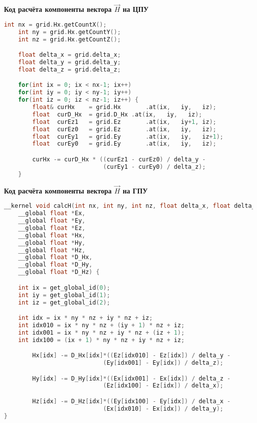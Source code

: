 
\textbf{Код расчёта компоненты вектора $ \vec{H} $ на ЦПУ}

\begin{lstlisting}[label={lst:HCPU},language=C++]
    int nx = grid.Hx.getCountX();
    int ny = grid.Hx.getCountY();
    int nz = grid.Hx.getCountZ();

    float delta_x = grid.delta_x;
    float delta_y = grid.delta_y;
    float delta_z = grid.delta_z;

    for(int ix = 0; ix < nx-1; ix++)
    for(int iy = 0; iy < ny-1; iy++)
    for(int iz = 0; iz < nz-1; iz++) {
        float& curHx	= grid.Hx		.at(ix,   iy,   iz);
        float  curD_Hx	= grid.D_Hx	.at(ix,   iy,   iz);
        float  curEz1	= grid.Ez		.at(ix,   iy+1, iz);
        float  curEz0	= grid.Ez		.at(ix,   iy,   iz);
        float  curEy1	= grid.Ey		.at(ix,   iy,   iz+1);
        float  curEy0	= grid.Ey		.at(ix,   iy,   iz);

        curHx -= curD_Hx * ((curEz1 - curEz0) / delta_y -
                            (curEy1 - curEy0) / delta_z);
    }
\end{lstlisting}

\clearpage


\textbf{Код расчёта компоненты вектора $ \vec{H} $ на ГПУ}

\begin{lstlisting}[label={lst:HGPU},language=C++]
__kernel void calcH(int nx, int ny, int nz, float delta_x, float delta_y, float delta_z,
    __global float *Ex,
    __global float *Ey,
    __global float *Ez,
    __global float *Hx,
    __global float *Hy,
    __global float *Hz,
    __global float *D_Hx,
    __global float *D_Hy,
    __global float *D_Hz) {

    int ix = get_global_id(0);
    int iy = get_global_id(1);
    int iz = get_global_id(2);

    int idx = ix * ny * nz + iy * nz + iz;
    int idx010 = ix * ny * nz + (iy + 1) * nz + iz;
    int idx001 = ix * ny * nz + iy * nz + (iz + 1);
    int idx100 = (ix + 1) * ny * nz + iy * nz + iz;

        Hx[idx] -= D_Hx[idx]*((Ez[idx010] - Ez[idx]) / delta_y -
                            (Ey[idx001] - Ey[idx]) / delta_z);

        Hy[idx] -= D_Hy[idx]*((Ex[idx001] - Ex[idx]) / delta_z -
                            (Ez[idx100] - Ez[idx]) / delta_x);

        Hz[idx] -= D_Hz[idx]*((Ey[idx100] - Ey[idx]) / delta_x -
                            (Ex[idx010] - Ex[idx]) / delta_y);
}
\end{lstlisting}